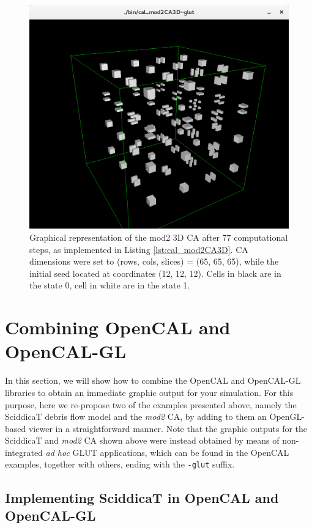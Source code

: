 \begin{figure}
  \begin{center}
    \includegraphics[width=12cm]{./images/OpenCAL/mod23DCA-glut}
    \caption{Graphical representation of the mod2 3D CA after 77 computational steps, as implemented in Listing \ref{lst:cal_mod2CA3D}. CA dimensions were set to (rows, cols, slices) = (65, 65, 65), while the initial seed located at coordinates (12, 12, 12). Cells in black are in the state 0, cell in white are in the state 1.}
    \label{fig:cal_mod2CA3D}
  \end{center}
\end{figure}


\section{Combining OpenCAL and OpenCAL-GL}\label{sec:combining_gl}

In this section, we will show how to combine the OpenCAL and
OpenCAL-GL libraries to obtain an immediate graphic output for your
simulation. For this purpose, here we re-propose two of the examples
presented above, namely the SciddicaT debris flow model and the
\emph{mod2} CA, by adding to them an OpenGL-based viewer in a
straightforward manner. Note that the graphic outputs for the
SciddicaT and \emph{mod2} CA shown above were instead obtained by
means of non-integrated \emph{ad hoc} GLUT applications, which can be
found in the OpenCAL examples, together with others, ending with the
\verb'-glut' suffix.

\subsection{Implementing SciddicaT in OpenCAL and OpenCAL-GL}\label{sec:calgl_sciddicaT}

